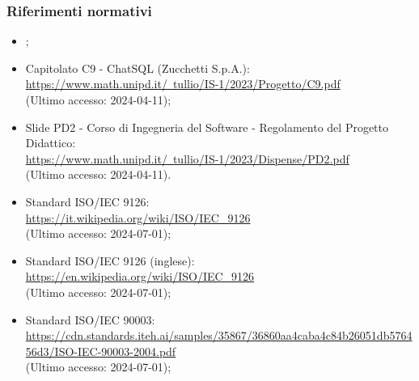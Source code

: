 \subsubsection{Riferimenti normativi}
\begin{itemize}
  \item \NormeDiProgetto;
  \item Capitolato C9 - ChatSQL (Zucchetti S.p.A.): \\ \href{https://www.math.unipd.it/~tullio/IS-1/2023/Progetto/C9.pdf}{https://www.math.unipd.it/~tullio/IS-1/2023/Progetto/C9.pdf} \\ (Ultimo accesso: 2024-04-11);
  \item Slide PD2 - Corso di Ingegneria del Software - Regolamento del Progetto Didattico: \\ \href{https://www.math.unipd.it/~tullio/IS-1/2023/Dispense/PD2.pdf}{https://www.math.unipd.it/~tullio/IS-1/2023/Dispense/PD2.pdf} \\ (Ultimo accesso: 2024-04-11).
  \item Standard ISO/IEC 9126: \\ \href{https://it.wikipedia.org/wiki/ISO/IEC_9126}{https://it.wikipedia.org/wiki/ISO/IEC\_9126}  \\ (Ultimo accesso: 2024-07-01);
  \item Standard ISO/IEC 9126 (inglese): \\ \href{https://en.wikipedia.org/wiki/ISO/IEC_9126}{https://en.wikipedia.org/wiki/ISO/IEC\_9126}  \\ (Ultimo accesso: 2024-07-01);
  \item Standard ISO/IEC 90003: \\ \href{https://cdn.standards.iteh.ai/samples/35867/36860aa4caba4c84b26051db576456d3/ISO-IEC-90003-2004.pdf}{https://cdn.standards.iteh.ai/samples/35867/36860aa4caba4c84b26051db576456d3/ISO-IEC-90003-2004.pdf}  \\ (Ultimo accesso: 2024-07-01);
\end{itemize}

